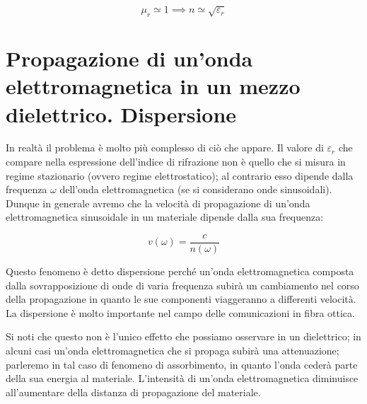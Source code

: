 \[
	\mu_r \simeq 1 \implies n \simeq  \sqrt{\varepsilon_r}
\]

\section{Propagazione di un'onda elettromagnetica in un mezzo dielettrico. Dispersione}

In realtà il problema è molto più complesso di ciò che appare. Il valore di $ \varepsilon_r  $ che compare nella espressione dell'indice di rifrazione non è quello che si misura in regime stazionario (ovvero regime elettrostatico); al contrario esso dipende dalla frequenza $\omega$ dell'onda elettromagnetica (se si considerano onde sinusoidali). Dunque in generale avremo che la velocità di propagazione di un'onda elettromagnetica sinusoidale in un materiale dipende dalla sua frequenza:

\[
	v(\omega)=\frac{c}{n(\omega)}
\]

Questo fenomeno è detto dispersione perché un'onda elettromagnetica composta dalla sovrapposizione di onde di varia frequenza subirà un cambiamento nel corso della propagazione in quanto le sue componenti viaggeranno a differenti velocità. La dispersione è molto importante nel campo delle comunicazioni in fibra ottica.

Si noti che questo non è l'unico effetto che possiamo osservare in un dielettrico; in alcuni casi un'onda elettromagnetica che si propaga subirà una attenuazione; parleremo in tal caso di fenomeno di assorbimento, in quanto l'onda cederà parte della sua energia al materiale. L'intensità di un'onda elettromagnetica diminuisce all'aumentare della distanza di propagazione del materiale.

